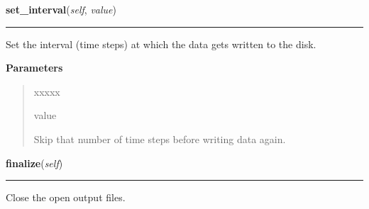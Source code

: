 \hspace{.8\funcindent}\begin{boxedminipage}{\funcwidth}

    \raggedright \textbf{set\_interval}(\textit{self}, \textit{value})

    \vspace{-1.5ex}

    \rule{\textwidth}{0.5\fboxrule}
\setlength{\parskip}{2ex}
    Set the interval (time steps) at which the data gets written to the
    disk.

\setlength{\parskip}{1ex}
      \textbf{Parameters}
      \vspace{-1ex}

      \begin{quote}
        \begin{Ventry}{xxxxx}

          \item[value]

          Skip that number of time steps before writing data again.

        \end{Ventry}

      \end{quote}

    \end{boxedminipage}

    \label{Serializer:Serializer:finalize}

    \vspace{0.5ex}

\hspace{.8\funcindent}\begin{boxedminipage}{\funcwidth}

    \raggedright \textbf{finalize}(\textit{self})

    \vspace{-1.5ex}

    \rule{\textwidth}{0.5\fboxrule}
\setlength{\parskip}{2ex}
    Close the open output files.

\setlength{\parskip}{1ex}
    \end{boxedminipage}

    \label{Serializer:Serializer:save_nodes}

    \vspace{0.5ex}

